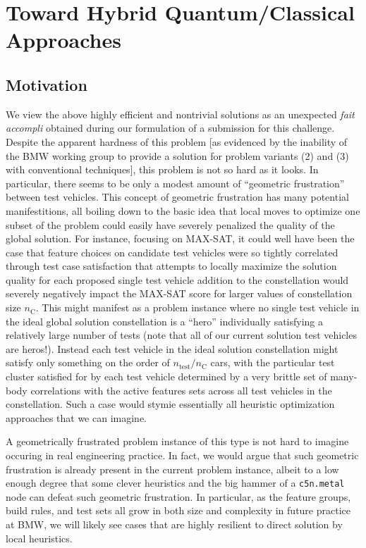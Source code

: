\documentclass[aps,pra,twocolumn,superscriptaddress,groupedaddress]{revtex4}  %
\begin{document}
\section{Toward Hybrid Quantum/Classical Approaches}

\subsection{Motivation}

We view the above highly efficient and nontrivial solutions as an unexpected
\emph{fait accompli} obtained during our formulation of a submission for this
challenge. Despite the apparent hardness of
this problem [as evidenced by the inability of the BMW working group to provide
a solution for problem variants (2) and (3) with conventional techniques], this
problem is not so hard as it looks. In particular, there seems to be only a
modest amount of ``geometric frustration'' between test vehicles. This concept
of geometric frustration has many potential manifestitions, all boiling down to
the basic idea that local moves to optimize one subset of the problem could
easily have severely penalized the quality of the global solution. For instance,
focusing on MAX-SAT, it could well have been the case that feature choices on
candidate test vehicles were so tightly correlated through test case
satisfaction that attempts to locally maximize the solution quality for each
proposed single test vehicle addition to the constellation would severely negatively
impact the MAX-SAT score for larger values of constellation size
$n_{\mathrm{C}}$. This might manifest as a problem instance where no single test
vehicle in the ideal global solution constellation is a ``hero'' individually
satisfying a relatively large number of tests (note that all of our current
solution test vehicles are heros!). Instead each test vehicle in the ideal
solution constellation might satisfy only something on the order of
$n_{\mathrm{test}} / n_{\mathrm{C}}$ cars, with the particular test cluster
satisfied for by each test vehicle determined by a very brittle set of many-body
correlations with the active features sets across all test vehicles in the
constellation. Such a case would stymie essentially all heuristic optimization
approaches that we can imagine.

A geometrically frustrated problem instance of this type is not hard to imagine
occuring in real engineering practice. In fact, we would argue that such
geometric frustration is already present in the current problem instance, albeit
to a low enough degree that some clever heuristics and the big hammer of a
\texttt{c5n.metal} node can defeat such geometric frustration.  In particular,
as the feature groups, build rules, and test sets all grow in both size and
complexity in future practice at BMW, we will likely see cases that are highly
resilient to direct solution by local heuristics.
\end{document}
